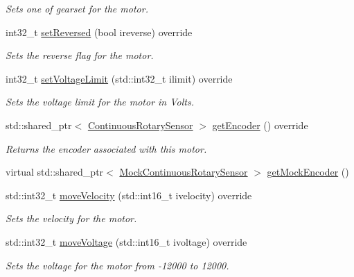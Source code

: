 \begin{DoxyCompactItemize}
\begin{DoxyCompactList}\small\item\em Sets one of gearset for the motor. \end{DoxyCompactList}\item 
int32\+\_\+t \mbox{\hyperlink{classokapi_1_1MockMotor_a775801b4a121c615a6442a80814e82b3}{set\+Reversed}} (bool ireverse) override
\begin{DoxyCompactList}\small\item\em Sets the reverse flag for the motor. \end{DoxyCompactList}\item 
int32\+\_\+t \mbox{\hyperlink{classokapi_1_1MockMotor_a18d880caa97e8f9732b6a08d02ca942c}{set\+Voltage\+Limit}} (std\+::int32\+\_\+t ilimit) override
\begin{DoxyCompactList}\small\item\em Sets the voltage limit for the motor in Volts. \end{DoxyCompactList}\item 
std\+::shared\+\_\+ptr$<$ \mbox{\hyperlink{classokapi_1_1ContinuousRotarySensor}{Continuous\+Rotary\+Sensor}} $>$ \mbox{\hyperlink{classokapi_1_1MockMotor_acf282485528942597eb1b334fc7625d5}{get\+Encoder}} () override
\begin{DoxyCompactList}\small\item\em Returns the encoder associated with this motor. \end{DoxyCompactList}\item 
virtual std\+::shared\+\_\+ptr$<$ \mbox{\hyperlink{classokapi_1_1MockContinuousRotarySensor}{Mock\+Continuous\+Rotary\+Sensor}} $>$ \mbox{\hyperlink{classokapi_1_1MockMotor_a87a24cbfaf90edacf369a23751f4c009}{get\+Mock\+Encoder}} ()
\item 
std\+::int32\+\_\+t \mbox{\hyperlink{classokapi_1_1MockMotor_aac646be0bcb1daa3dbe926ecd05a4353}{move\+Velocity}} (std\+::int16\+\_\+t ivelocity) override
\begin{DoxyCompactList}\small\item\em Sets the velocity for the motor. \end{DoxyCompactList}\item 
std\+::int32\+\_\+t \mbox{\hyperlink{classokapi_1_1MockMotor_af511136af72163625fd166bc4bcb2270}{move\+Voltage}} (std\+::int16\+\_\+t ivoltage) override
\begin{DoxyCompactList}\small\item\em Sets the voltage for the motor from -\/12000 to 12000. \end{DoxyCompactList}\item 

\end{DoxyCompactItemize}
